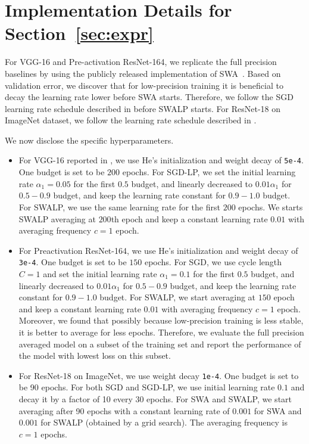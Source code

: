 \section{Implementation Details for Section~\ref{sec:expr}}\label{sec:dlexp}
For VGG-16 and Pre-activation ResNet-164, we replicate the full precision baselines by using the publicly released implementation of SWA~\cite{SWA-repo}. Based on validation error, we discover that for low-precision training it is beneficial to decay the learning rate lower before SWA starts. Therefore, we follow the SGD learning rate schedule described in \citet{SWA} before SWALP starts. For ResNet-18 on ImageNet dataset, we follow the learning rate schedule described in \citet{resnet}.

We now disclose the specific hyperparameters.
\begin{itemize}
    \item For VGG-16 reported in \citet{SWA}, we use He's initialization \cite{he-init} and weight decay of \texttt{5e-4}. One budget is set to be $200$ epochs. For SGD-LP, we set the initial learning rate $\alpha_1=0.05$ for the first $0.5$ budget, and linearly decreased to $0.01 \alpha_1$ for $0.5-0.9$ budget, and keep the learning rate constant for $0.9-1.0$ budget. For SWALP, we use the same learning rate for the first $200$ epochs. We starts SWALP averaging at $200$th epoch and keep a constant learning rate $0.01$ with averaging frequency $c=1$ epoch. 
    \item For Preactivation ResNet-164, we use He's initialization \cite{he-init} and weight decay of \texttt{3e-4}. One budget is set to be $150$ epochs. For SGD, we use cycle length $C=1$ and set the initial learning rate $\alpha_1=0.1$ for the first $0.5$ budget, and linearly decreased to $0.01 \alpha_1$ for $0.5-0.9$ budget, and keep the learning rate constant for $0.9-1.0$ budget. For SWALP, we start averaging at $150$ epoch and keep a constant learning rate $0.01$ with averaging frequency $c=1$ epoch. Moreover, we found that possibly because low-precision training is less stable, it is better to average for less epochs. Therefore, we evaluate the full precision averaged model on a subset of the training set and report the performance of the model with lowest loss on this subset. 
    \item For ResNet-18 on ImageNet, we use weight decay \texttt{1e-4}. One budget is set to be 90 epochs. For both SGD and SGD-LP, we use initial learning rate $0.1$ and decay it by a factor of 10 every 30 epochs. For SWA and SWALP, we start averaging after 90 epochs with a constant learning rate of $0.001$ for SWA and $0.001$ for SWALP (obtained by a grid search). The averaging frequency is $c=1$ epochs. 
\end{itemize}
    
